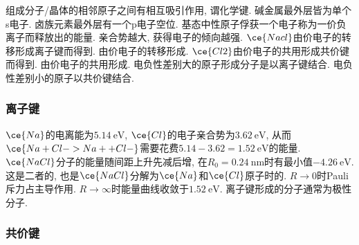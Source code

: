 \documentclass[hidelinks]{ctexart}
\begin{document}
\newpoint{}组成分子/晶体的相邻原子之间有相互吸引作用, 谓化学键.
\newpoint{}碱金属最外层皆为单个s电子. 卤族元素最外层有一个p电子空位.
 基态中性原子俘获一个电子称为一价负离子而释放出的能量. 亲合势越大, 获得电子的倾向越强.
\newpoint{}$\ce{Nacl}$由价电子的转移形成离子键而得到. 由价电子的转移形成.
\newpoint{}$\ce{Cl2}$由价电子的共用形成共价键而得到. 由价电子的共用形成.
\newpoint{}电负性差别大的原子形成分子是以离子键结合. 电负性差别小的原子以共价键结合.

\subsubsection{离子键} %
\label{ssub:离子键}

\newpoint{}$\ce{Na}$的电离能为$\SI{5.14}{\eV}$, $\ce{Cl}$的电子亲合势为$\SI{3.62}{\eV}$, 从而$\ce{Na + Cl -> Na+ + Cl-}$需要花费$5.14-3.62 = \SI{1.52}{\eV}$的能量.
\newpoint{}$\ce{NaCl}$分子的能量随间距上升先减后增, 在$R_0 = \SI{0.24}{\nano\meter}$时有最小值$\SI{-4.26}{\eV}$. 这是二者的, 也是$\ce{NaCl}$分解为$\ce{Na}$和$\ce{Cl}$原子时的.
\newpoint{}$R\rightarrow 0$时Pauli斥力占主导作用. $R\rightarrow \infty$时能量曲线收敛于$\SI{1.52}{\eV}$.
\newpoint{}离子键形成的分子通常为极性分子.


\subsubsection{共价键} %
\label{ssub:共价键}
\end{document}
